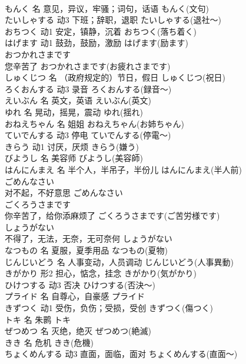 \documentclass[8pt]{extreport}
\begin{document}
\begin{CJK}{UTF8}{min}
\\	もんく	名	意见，异议，牢骚；词句，话语	もんく(文句)	
\\	たいしゃする	动3	下班；辞职，退职	たいしゃする(退社～)	
\\	おちつく	动1	安定，镇静，沉着	おちつく(落ち着く)	
\\	はげます	动1	鼓劲，鼓励，激励	はげます(励ます)	
\\	おつかれさまです	
\\	您辛苦了	おつかれさまです(お疲れさまです)	
\\	しゅくじつ	名	（政府规定的）节日，假日	しゅくじつ(祝日)	
\\	ろくおんする	动3	录音	ろくおんする(録音～)	
\\	えいぶん	名	英文，英语	えいぶん(英文)	
\\	ゆれ	名	晃动，摇晃，震动	ゆれ(揺れ)	
\\	おねえちゃん	名	姐姐	おねえちゃん(お姉ちゃん)	
\\	ていでんする	动3	停电	ていでんする(停電～)	
\\	きらう	动1	讨厌，厌烦	きらう(嫌う)	
\\	びようし	名	美容师	びようし(美容師)	
\\	はんにんまえ	名	半个人，半吊子，半份儿	はんにんまえ(半人前)	
\\	ごめんなさい	
\\	对不起，不好意思	ごめんなさい	
\\	ごくろうさまです	
\\	你辛苦了，给你添麻烦了	ごくろうさまです(ご苦労様です)	
\\	しょうがない	
\\	不得了，无法，无奈，无可奈何	しょうがない	
\\	なつもの	名	夏服，夏季用品	なつもの(夏物)	
\\	じんじいどう	名	人事变动，人员调动	じんじいどう(人事異動)	
\\	きがかり	形2	担心，惦念，挂念	きがかり(気がかり)	
\\	ひけつする	动3	否决	ひけつする(否決～)	
\\	プライド	名	自尊心，自豪感	プライド	
\\	きずつく	动1	受伤，负伤；受损，受创	きずつく(傷つく)	
\\	トキ	名	朱鹮	トキ	
\\	ぜつめつ	名	灭绝，绝灭	ぜつめつ(絶滅)	
\\	きき	名	危机	きき(危機)	
\\	ちょくめんする	动3	直面，面临，面对	ちょくめんする(直面～)	

\end{CJK}
\end{document}
